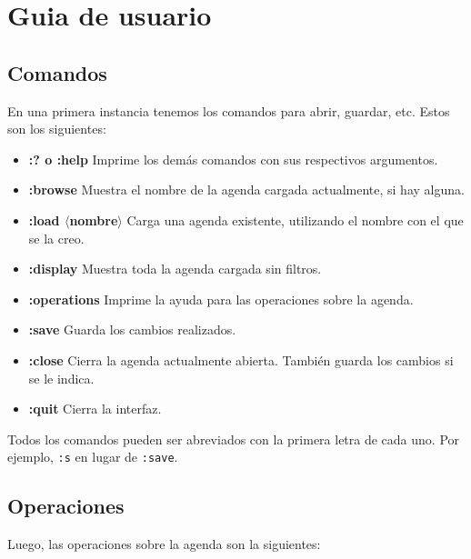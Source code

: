 \documentclass[a4paper,12pt]{article}
\begin{document}
  \section*{Guia de usuario}
  \subsection*{Comandos}
    En una primera instancia tenemos los comandos para abrir, guardar, etc. Estos son los siguientes:
    \begin{itemize}
      \item \textbf{:? o :help} Imprime los demás comandos con sus respectivos argumentos.
      \item \textbf{:browse} Muestra el nombre de la agenda cargada actualmente, si hay alguna.
      \item \textbf{:load $\langle$nombre$\rangle$} Carga una agenda existente, utilizando el nombre con el que se la creo.
      \item \textbf{:display} Muestra toda la agenda cargada sin filtros.
      \item \textbf{:operations} Imprime la ayuda para las operaciones sobre la agenda.
      \item \textbf{:save} Guarda los cambios realizados.
      \item \textbf{:close} Cierra la agenda actualmente abierta. También guarda los cambios si se le indica.
      \item \textbf{:quit} Cierra la interfaz.
    \end{itemize}
    Todos los comandos pueden ser abreviados con la primera letra de cada uno. Por ejemplo, \texttt{:s} en lugar de \texttt{:save}.

    \subsection*{Operaciones}
    Luego, las operaciones sobre la agenda son la siguientes:
\end{document}
